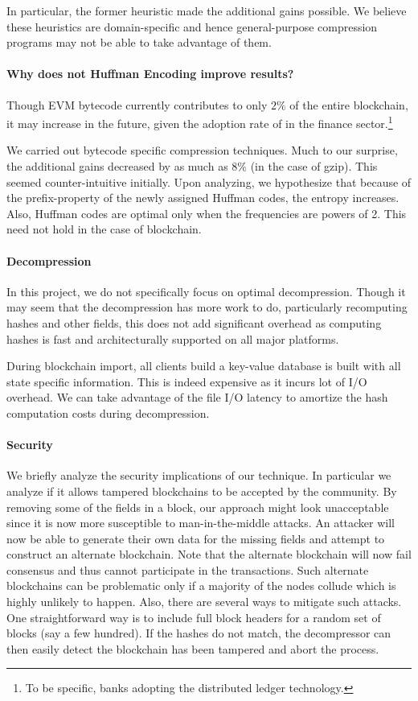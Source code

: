 In particular, the former heuristic made the additional gains possible. 
We believe these heuristics are domain-specific and hence general-purpose
compression programs may not be able to take advantage of them.

\paragraph{Why does not Huffman Encoding improve results?}
Though EVM bytecode currently contributes to only $2\%$ of the entire blockchain, it may increase in the future, given the adoption rate of \eth{}  in the finance sector.\footnote{To be specific, banks adopting the distributed ledger technology.} 

We carried out bytecode specific compression techniques. Much to our surprise, the additional gains decreased by as much as $8\%$ (in the case of gzip).
This seemed counter-intuitive initially. Upon analyzing, we hypothesize that
because of the prefix-property of the newly assigned Huffman codes, the entropy increases.
Also, Huffman codes are optimal only when the frequencies are powers of 2. This need not hold in the case of blockchain.


\paragraph{Decompression}
In this project, we do not specifically focus on optimal decompression. 
Though it may seem that the decompression has more work to do, particularly recomputing hashes and other fields, this does not add significant overhead as computing hashes is fast and architecturally supported on all major platforms.

During blockchain import, all \eth{} clients build a key-value database is built with all state specific information. This is indeed expensive as it incurs lot of I/O overhead.
We can take advantage of the file I/O latency to amortize the hash computation costs during decompression.



\paragraph{Security}

We briefly analyze the security implications of our technique. 
In particular we analyze if it allows tampered blockchains to be accepted
by the community.
By removing some of the fields in a block,
our approach might look unacceptable since
it is now more susceptible to man-in-the-middle attacks. 
An attacker will now be able to generate their own data for the missing fields and attempt to construct an alternate blockchain.
Note that the alternate blockchain will now fail consensus and
thus cannot participate in the \eth{} transactions. 
Such alternate blockchains can be problematic 
only if a majority of the nodes collude which is highly unlikely to happen. 
Also, there are several ways to mitigate such attacks.
One straightforward way is to include full block headers for a random set of blocks (say a few hundred). 
If the hashes do not match,
the decompressor can then easily detect  the blockchain has been
tampered and abort the process.

